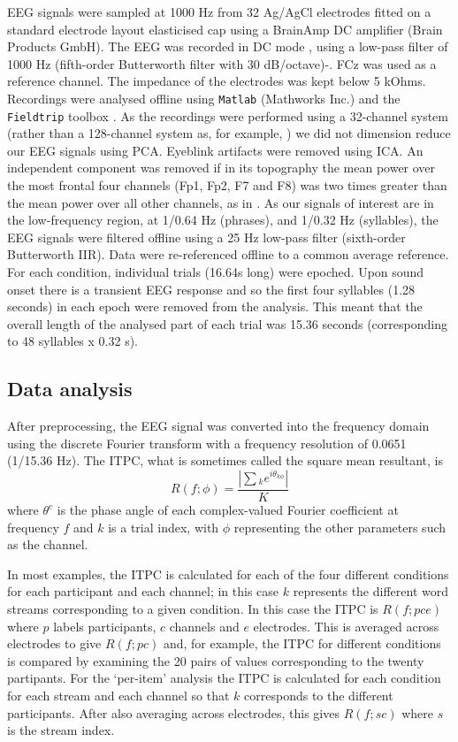 \documentclass[10pt,letterpaper]{article}
\newcommand{\citet}[1]{\cite{#1}}
\begin{document}
EEG signals were sampled at 1000 Hz from 32 Ag/AgCl electrodes fitted
on a standard electrode layout elasticised cap using a BrainAmp DC
amplifier (Brain Products GmbH). The EEG was recorded in DC mode ,
using a low-pass filter of 1000 Hz (fifth-order Butterworth filter
with 30 dB/octave)-. FCz was used as a reference channel. The
impedance of the electrodes was kept below 5 kOhms. Recordings were
analysed offline using \texttt{Matlab} (Mathworks Inc.) and the
\texttt{Fieldtrip} toolbox \cite{FieldTrip}. As the recordings were
performed using a 32-channel system (rather than a 128-channel system
as, for example, \citet{DingEtAl2017}) we did not dimension reduce our
EEG signals using PCA. Eyeblink artifacts were removed using ICA. An
independent component was removed if in its topography the mean power
over the most frontal four channels (Fp1, Fp2, F7 and F8) was two
times greater than the mean power over all other channels, as in
\citet{DingEtAl2017}. As our signals of interest are in the
low-frequency region, at 1/0.64 Hz (phrases), and 1/0.32 Hz
(syllables), the EEG signals were filtered offline using a 25 Hz
low-pass filter (sixth-order Butterworth IIR). Data were re-referenced
offline to a common average reference. For each condition, individual
trials (16.64s long) were epoched. Upon sound onset there is a
transient EEG response and so the first four syllables (1.28 seconds)
in each epoch were removed from the analysis. This meant that the
overall length of the analysed part of each trial was 15.36 seconds
(corresponding to 48 syllables x 0.32 s).

\subsection*{Data analysis}

After preprocessing, the EEG signal was converted into the frequency
domain using the discrete Fourier transform with a frequency
resolution of 0.0651 (1/15.36 Hz). The ITPC, what is sometimes called
the square mean resultant, is
\begin{equation}
\label{eq:itpc}
R(f;\phi)=\frac{\left|\sum{_k} e^{i\theta_{k\phi}}\right|}{K}
\end{equation}
where $\theta^c$ is the phase angle of each complex-valued Fourier
coefficient at frequency $f$ and $k$ is a trial index, with $\phi$
representing the other parameters such as the channel.

In most examples, the ITPC is calculated for each of the four
different conditions for each participant and each channel; in this
case $k$ represents the different word streams corresponding to a
given condition. In this case the ITPC is $R(f;pce)$ where $p$ labels
participants, $c$ channels and $e$ electrodes. This is averaged across
electrodes to give $R(f;pc)$ and, for example, the ITPC for different
conditions is compared by examining the 20 pairs of values
corresponding to the twenty partipants. For the `per-item' analysis
the ITPC is calculated for each condition for each stream and each
channel so that $k$ corresponds to the different participants. After
also averaging across electrodes, this gives $R(f;sc)$ where $s$ is
the stream index.
\end{document}

